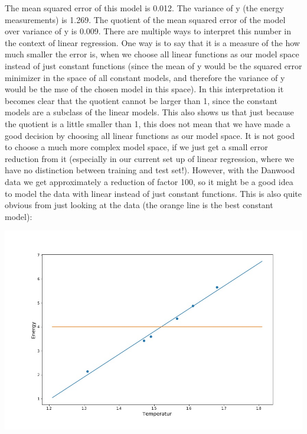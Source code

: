 The mean squared error of this model is 0.012. The variance of y (the energy measurements) is 1.269. The quotient of the mean squared error of the model over variance of y is 0.009. There are multiple ways to interpret this number in the context of linear regression. One way is to say that it is a measure of the how much smaller the error is, when we choose all linear functions as our model space instead of just constant functions (since the mean of y would be the squared error minimizer in the space of all constant models, and therefore the variance of y would be the mse of the chosen model in this space). In this interpretation it becomes clear that the quotient cannot be larger than 1, since the constant models are a subclass of the linear models. This also shows us that just because the quotient is a little smaller than 1, this does not mean that we have made a good decision by choosing all linear functions as our model space. It is not good to choose a much more complex model space, if we just get a small error reduction from it (especially in our current set up of linear regression, where we have no distinction between training and test set!). However, with the Danwood data we get approximately a reduction of factor 100, so it might be a good idea to model the data with linear instead of just constant functions. This is also quite obvious from just looking at the data (the orange line is the best constant model):

\includegraphics[scale = 0.45]{linear_regression/reg_plot_2.jpg}

